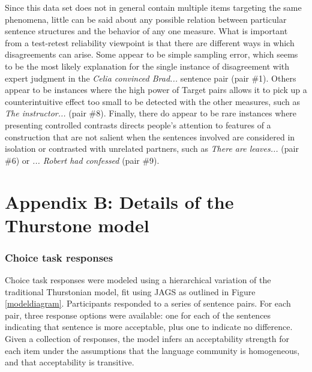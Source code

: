 \documentclass[doc]{apa6}
\newcommand{\targchoice}{{\sc Target pairs}}
\newcommand{\thurstone}{{\sc Thurstone}}
\begin{document}
\begin{small}
\begin{adjustwidth}{-1cm}{}
Since this data set does not in general contain multiple items targeting the same phenomena, little can be said about any possible relation between particular sentence structures and the behavior of any one measure. What is important from a test-retest reliability viewpoint is that there are different ways in which disagreements can arise. Some appear to be simple sampling error, which seems to be the most likely explanation for the single instance of disagreement with expert judgment in the {\it Celia convinced Brad...} sentence pair (pair \#1). Others appear to be instances where the high power of \targchoice{} allows it to pick up a counterintuitive effect too small to be detected with the other measures, such as {\it The instructor...} (pair \#8). Finally, there do appear to be rare instances where presenting controlled contrasts directs people's attention to features of a construction that are not salient when the sentences involved are considered in isolation or contrasted with unrelated partners, such as {\it There are leaves...} (pair \#6) or {\it ... Robert had confessed} (pair \#9).
\label{tab:conflictsentences}
\end{adjustwidth}
\end{small}

\section*{Appendix B: Details of the \thurstone{} model}

\subsubsection*{Choice task responses}

Choice task responses were modeled using a hierarchical variation of the traditional Thurstonian model, fit using JAGS \citep{plummer03jags} as outlined in Figure \ref{modeldiagram}.
Participants responded to a series of sentence pairs. For each pair, three response options were available: one for each of the sentences indicating that sentence is more acceptable, plus one to indicate no difference. Given a collection of responses, the model infers an acceptability strength for each item under the assumptions that the language community is homogeneous, and that acceptability is transitive.
\end{document}

